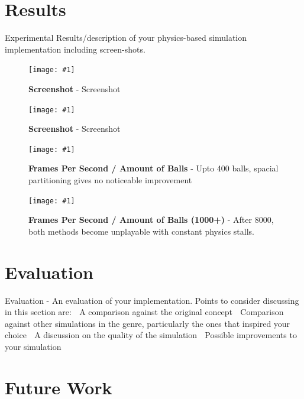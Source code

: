 \documentclass[conference]{acmsiggraph}
\newcommand{\figuremacroW}[4]{
	\begin{figure}[h] %
		\centering
		\texttt{[image: \#1]}
		\caption[#2]{\textbf{#2} - #3}
		\label{fig:#1}
	\end{figure}
}
\begin{document}
\section{Results}
Experimental Results/description of your physics-based simulation implementation
including screen-shots.

\figuremacroW
{screen2}
{Screenshot}
{Screenshot}
{1.0}

\figuremacroW
{screen1}
{Screenshot}
{Screenshot}
{1.0}

\figuremacroW
{chart1-a}
{Frames Per Second / Amount of Balls}
{Upto 400 balls, spacial partitioning gives no noticeable improvement}
{1.0}

\figuremacroW
{chart1-b}
{Frames Per Second / Amount of Balls (1000+)}
{After 8000, both methods become unplayable with constant physics stalls.}
{1.0}


\section{Evaluation}
Evaluation - An evaluation of your implementation. Points to consider discussing in this
section are:
 A comparison against the original concept
 Comparison against other simulations in the genre, particularly the ones that
inspired your choice
 A discussion on the quality of the simulation
 Possible improvements to your simulation

\section{Future Work}








\end{document}
